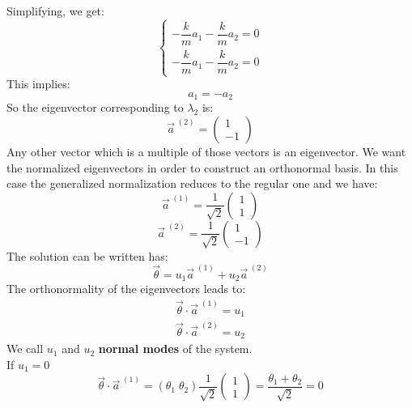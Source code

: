 Simplifying, we get:
\begin{equation}
    \begin{cases}
        -\dfrac{k}{m} a_1 - \dfrac{k}{m} a_2 = 0\\[5pt]
        -\dfrac{k}{m} a_1 - \dfrac{k}{m} a_2 = 0
    \end{cases}
\end{equation}
This implies:
\begin{equation}
    a_1 = -a_2
\end{equation}
So the eigenvector corresponding to $\lambda_2$ is:
\begin{equation}
    \vec{a}^{\;(2)} = \begin{pmatrix}
        1\\
        -1
    \end{pmatrix}
\end{equation}
Any other vector which is a multiple of those vectors is an eigenvector. We want the normalized eigenvectors in order to construct an orthonormal basis. In this case the generalized normalization reduces to the regular one and we have:
\begin{equation}
    \vec{a}^{\;(1)} = \dfrac{1}{\sqrt{2}}\begin{pmatrix}
        1\\
        1
    \end{pmatrix}
\end{equation}
\begin{equation}
    \vec{a}^{\;(2)} = \dfrac{1}{\sqrt{2}}\begin{pmatrix}
        1\\
        -1
    \end{pmatrix}
\end{equation}
The solution can be written has:
\begin{equation}
    \vec{\theta} = u_1\vec{a}^{\;(1)}+u_2\vec{a}^{\;(2)}
\end{equation}
The orthonormality of the eigenvectors leads to:
\begin{equation}
    \begin{split}
        \vec{\theta} \cdot \vec{a}^{\;(1)} = u_1\\
        \vec{\theta} \cdot \vec{a}^{\;(2)} = u_2
    \end{split}
\end{equation}
We call $u_1$ and $u_2$ \textbf{normal modes} of the system.\\
If $u_1 =0$
\begin{equation}
    \vec{\theta} \cdot \vec{a}^{\;(1)} = (\theta_1\;\theta_2)\dfrac{1}{\sqrt{2}}\begin{pmatrix}
        1\\
        1
    \end{pmatrix} = \dfrac{\theta_1 + \theta_2}{\sqrt{2}} = 0
\end{equation}
